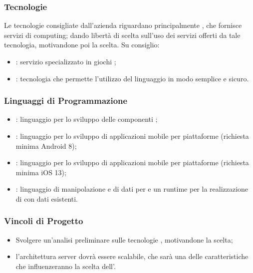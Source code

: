 \documentclass[]{article}
\begin{document}
		\subsubsection{Tecnologie}
		Le tecnologie consigliate dall'azienda riguardano principalmente , che fornisce servizi di  computing; dando libertà di scelta sull'uso dei servizi offerti da tale tecnologia, motivandone poi la scelta.
		Su consiglio:
		\begin{itemize}
			\item {}: servizio specializzato in giochi ;
			\item {}: tecnologia che permette l'utilizzo del linguaggio  in modo semplice e sicuro.

		\end{itemize}

		\subsubsection{Linguaggi di Programmazione}
		\begin{itemize}
			\item {}: linguaggio per lo sviluppo delle componenti ;
			\item {}: linguaggio per lo sviluppo di applicazioni mobile per piattaforme  (richiesta minima Android 8);
			\item {}: linguaggio per lo sviluppo di applicazioni mobile per piattaforme (richiesta minima iOS 13);
			\item {}: linguaggio di manipolazione e  di dati  per  e un runtime per la realizzazione di  con dati esistenti.
		\end{itemize}

		\subsubsection{Vincoli di Progetto}
		\begin{itemize}
			\item Svolgere un'analisi preliminare sulle tecnologie , motivandone la scelta;
			\item l'architettura server dovrà essere scalabile, che sarà una delle caratteristiche che influenzeranno la scelta dell'.
		\end{itemize}
\end{document}
